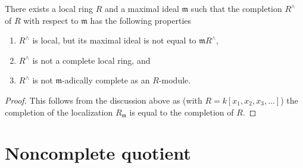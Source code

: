 \begin{lemma}
\label{lemma-noncomplete-completion}
There exists a local ring $R$ and a maximal ideal $\mathfrak m$ such that
the completion $R^\wedge$ of $R$ with respect to $\mathfrak m$ has the
following properties
\begin{enumerate}
\item $R^\wedge$ is local, but its maximal ideal is not equal to
$\mathfrak m R^\wedge$,
\item $R^\wedge$ is not a complete local ring, and
\item $R^\wedge$ is not $\mathfrak m$-adically complete as an $R$-module.
\end{enumerate}
\end{lemma}

\begin{proof}
This follows from the discussion above as (with $R = k[x_1, x_2, x_3, \ldots]$)
the completion of the localization $R_{\mathfrak m}$ is equal to the
completion of $R$.
\end{proof}





\section{Noncomplete quotient}
\label{section-noncomplete-quotient}

